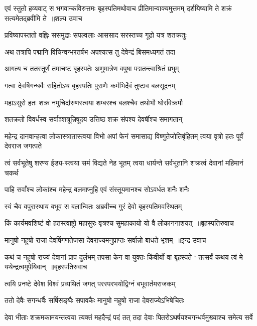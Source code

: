 \fourlineindentedshloka
{एवं स्तुतो हव्यवाट् स भगवान्कविरुत्तमः}
{बृहस्पतिमथोवाच प्रीतिमान्वाक्यमुत्तमम्}
{दर्शयिष्यामि ते शक्रं सत्यमेतद्ब्रवीमि ते ॥शल्य उवाच}
{}


\twolineshloka
{प्रविष्यापस्ततो वह्निः ससमुद्राः सपल्वलाः}
{आससाद सरस्तच्च गूढो यत्र शतक्रतुः}


\twolineshloka
{अथ तत्रापि पद्मानि विचिन्वन्भरतर्षभ}
{अपश्यत्स तु देवेन्द्रं बिसमध्यगतं तदा}


\twolineshloka
{आगत्य च ततस्तूर्णं तमाचष्ट बृहस्पतेः}
{अणुमात्रेण वपुषा पद्मतन्त्वाश्रितं प्रभुम्}


\twolineshloka
{गत्वा देवर्षिगन्धर्वैः सहितोऽथ बृहस्पतिः}
{पुराणैः कर्मभिर्देवं तुष्टाव बलसूदनम्}


\twolineshloka
{महाऽसुरो हतः शक्र नमुचिर्दारुणस्त्वया}
{शम्बरश्च बलश्चैव तथोभौ घोरविक्रमौ}


\twolineshloka
{शतक्रतो विवर्धस्व सर्वाञ्शत्रून्निषूदय}
{उत्तिष्ठ शक्र संपश्य देवर्षीश्च समागतान्}


\threelineshloka
{महेन्द्र दानवान्हत्वा लोकास्त्रातास्त्वया विभो}
{अपां फेनं समासाद्य विष्णुतेजोतिबृंहितम्}
{त्वया वृत्रो हतः पूर्वं देवराज जगत्पते}


\twolineshloka
{त्वं सर्वभूतेषु शरण्य ईड्य-स्त्वया समं विद्यते नेह भूतम्}
{त्वया धार्यन्ते सर्वभूतानि शक्रत्वं देवानां महिमानं चकर्थ}


\twolineshloka
{पाहि सर्वांश्च लोकांश्च महेन्द्र बलमाप्नुहि}
{एवं संस्तूयमानश्च सोऽवर्धत शनैः शनैः}


\twolineshloka
{स्वं चैव वपुरास्थाय बभूव स बलान्वितः}
{अब्रवीच्च गुरं देवो बृहस्पतिमवस्थितम्}


\threelineshloka
{किं कार्यमवशिष्टं वो हतस्त्वाष्ट्रो महासुरः}
{वृत्रश्च सुमहाकायो यो वै लोकाननाशयत् ॥बृहस्पतिरुवाच}
{}


\threelineshloka
{मानुषो नहुषो राजा देवर्षिगणतेजसा}
{देवराज्यमनुप्राप्तः सर्वान्नो बाधते भृशम् ॥इन्द्र उवाच}
{}


\fourlineindentedshloka
{कथं च नहुषो राज्यं देवानां प्राप दुर्लभम्}
{तपसा केन वा युक्तः किंवीर्यो वा बृहस्पते}
{` तत्सर्वं कथय त्वं मे यथेन्द्रत्वमुपेयिवान् ॥बृहस्पतिरुवाच}
{}


\twolineshloka
{त्वयि प्रनष्टे देवेश विश्वं प्रव्यथितं जगत्}
{परस्परभयोद्विग्नं बभूवार्तमराजकम्}


\twolineshloka
{ततो देवैः सगन्धर्वैः सर्षिसङ्घैः सपावकैः}
{मानुषो नहुषो राजा देवराज्येऽभिषेचितः}


\twolineshloka
{देवा भीताः शक्रमकामयन्तत्वया त्यक्तं महदैन्द्रं पदं तत्}
{तदा देवाः पितरोऽथर्षयश्चगन्धर्वमुख्याश्च समेत्य सर्वे}


